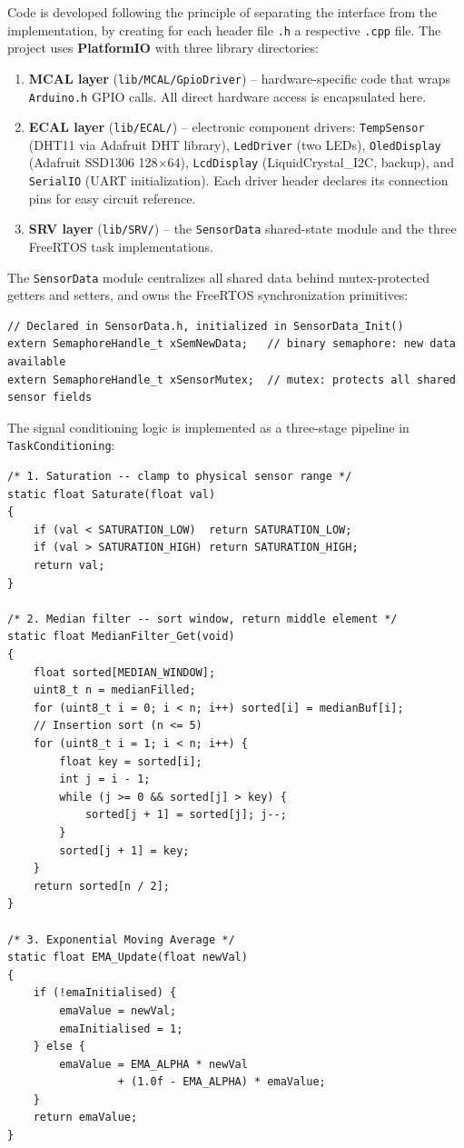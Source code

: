 Code is developed following the principle of separating the interface from the
implementation, by creating for each header file \texttt{.h} a respective \texttt{.cpp}
file. The project uses \textbf{PlatformIO} with three library directories:

\begin{enumerate}
  \item \textbf{MCAL layer} (\texttt{lib/MCAL/GpioDriver}) -- hardware-specific code that
    wraps \texttt{Arduino.h} GPIO calls. All direct hardware access is encapsulated here.
  \item \textbf{ECAL layer} (\texttt{lib/ECAL/}) -- electronic component drivers:
    \texttt{TempSensor} (DHT11 via Adafruit DHT library),
    \texttt{LedDriver} (two LEDs),
    \texttt{OledDisplay} (Adafruit SSD1306 128$\times$64),
    \texttt{LcdDisplay} (LiquidCrystal\_I2C, backup), and
    \texttt{SerialIO} (UART initialization).
    Each driver header declares its connection pins for easy circuit reference.
  \item \textbf{SRV layer} (\texttt{lib/SRV/}) -- the \texttt{SensorData} shared-state
    module and the three FreeRTOS task implementations.
\end{enumerate}

The \texttt{SensorData} module centralizes all shared data behind mutex-protected
getters and setters, and owns the FreeRTOS synchronization primitives:

\begin{lstlisting}
// Declared in SensorData.h, initialized in SensorData_Init()
extern SemaphoreHandle_t xSemNewData;   // binary semaphore: new data available
extern SemaphoreHandle_t xSensorMutex;  // mutex: protects all shared sensor fields
\end{lstlisting}

The signal conditioning logic is implemented as a three-stage pipeline in
\texttt{TaskConditioning}:
\begin{lstlisting}
/* 1. Saturation -- clamp to physical sensor range */
static float Saturate(float val)
{
    if (val < SATURATION_LOW)  return SATURATION_LOW;
    if (val > SATURATION_HIGH) return SATURATION_HIGH;
    return val;
}

/* 2. Median filter -- sort window, return middle element */
static float MedianFilter_Get(void)
{
    float sorted[MEDIAN_WINDOW];
    uint8_t n = medianFilled;
    for (uint8_t i = 0; i < n; i++) sorted[i] = medianBuf[i];
    // Insertion sort (n <= 5)
    for (uint8_t i = 1; i < n; i++) {
        float key = sorted[i];
        int j = i - 1;
        while (j >= 0 && sorted[j] > key) {
            sorted[j + 1] = sorted[j]; j--;
        }
        sorted[j + 1] = key;
    }
    return sorted[n / 2];
}

/* 3. Exponential Moving Average */
static float EMA_Update(float newVal)
{
    if (!emaInitialised) {
        emaValue = newVal;
        emaInitialised = 1;
    } else {
        emaValue = EMA_ALPHA * newVal
                 + (1.0f - EMA_ALPHA) * emaValue;
    }
    return emaValue;
}
\end{lstlisting}

